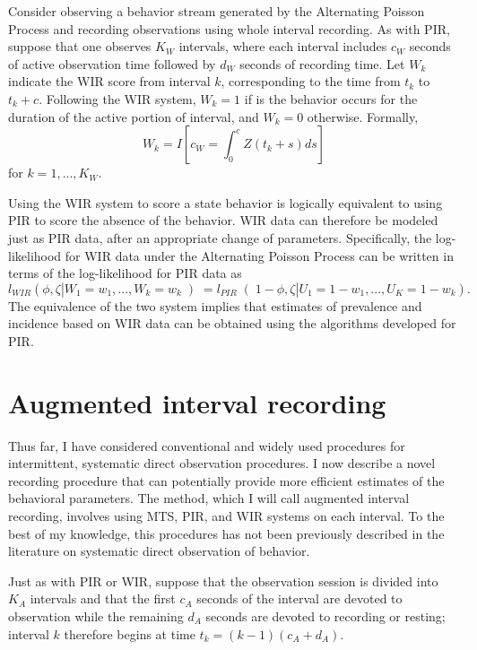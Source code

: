 \documentclass[man, noextraspace, floatsintext]{apa6}\usepackage[]{graphicx}\usepackage[]{color}
\begin{document}
Consider observing a behavior stream generated by the Alternating Poisson Process and recording observations using whole interval recording. 
As with PIR, suppose that one observes $K_W$ intervals, where each interval includes $c_W$ seconds of active observation time followed by $d_W$ seconds of recording time. 
Let $W_k$ indicate the WIR score from interval $k$, corresponding to the time from $t_k$ to $t_k + c$. 
Following the WIR system, $W_k = 1$ if is the behavior occurs for the duration of the active portion of interval, and $W_k = 0$ otherwise. 
Formally, 
\begin{equation}
W_k = I\left[ c_W = \int_0^c Z\left(t_k + s \right) ds\right]
\end{equation}
for $k = 1,...,K_W$. 

Using the WIR system to score a state behavior is logically equivalent to using PIR to score the absence of the behavior. 
WIR data can therefore be modeled just as PIR data, after an appropriate change of parameters. 
Specifically, the log-likelihood for WIR data under the Alternating Poisson Process can be written in terms of the log-likelihood for PIR data as
\begin{equation}
l_{WIR}\left(\phi, \zeta | W_1 = w_1,...,W_k = w_k \left) = l_{PIR}\right(1 - \phi, \zeta | U_1 = 1 - w_1,...,U_K = 1 - w_k\right).
\end{equation}
The equivalence of the two system implies that estimates of prevalence and incidence based on WIR data can be obtained using the algorithms developed for PIR. 


\section{Augmented interval recording}
\label{sec:AIR}

Thus far, I have considered conventional and widely used procedures for intermittent, systematic direct observation procedures. 
I now describe a novel recording procedure that can potentially provide more efficient estimates of the behavioral parameters. 
The method, which I will call augmented interval recording, involves using MTS, PIR, and WIR systems on each interval. 
To the best of my knowledge, this procedures has not been previously described in the literature on systematic direct observation of behavior. 

Just as with PIR or WIR, suppose that the observation session is divided into $K_A$ intervals and that the first $c_A$ seconds of the interval are devoted to observation while the remaining $d_A$ seconds are devoted to recording or resting; interval $k$ therefore begins at time $t_k = (k - 1)(c_A + d_A)$. 
\end{document}
